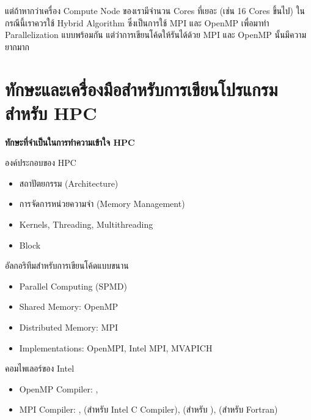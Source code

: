แต่ถ้าหากว่าเครื่อง Compute Node ของเรามีจำนวน Cores ที่เยอะ (เช่น 16 Cores ขึ้นไป) ในกรณีนี้เราควรใช้ Hybrid Algorithm ซึ่งเป็นการใช้
MPI และ OpenMP เพื่อมาทำ Parallelization แบบพร้อมกัน แต่ว่าการเขียนโค้ดให้รันได้ด้วย MPI และ OpenMP นั้นมีความยากมาก

\section{ทักษะและเครื่องมือสำหรับการเขียนโปรแกรมสำหรับ HPC}

\noindent \textbf{ทักษะที่จำเป็นในการทำความเข้าใจ HPC}

\noindent องค์ประกอบของ HPC
%
\begin{itemize}[topsep=0pt,noitemsep]
  \setlength\itemsep{0.5em}
  \item สถาปัตยกรรม (Architecture)

  \item การจัดการหน่วยความจำ (Memory Management)

  \item Kernels, Threading, Multithreading

  \item Block
\end{itemize}

\noindent อัลกอริทึมสำหรับการเขียนโค้ดแบบขนาน
%
\begin{itemize}[topsep=0pt,noitemsep]
  \setlength\itemsep{0.5em}
  \item Parallel Computing (SPMD)

  \item Shared Memory: OpenMP

  \item Distributed Memory: MPI

  \item Implementations: OpenMPI, Intel MPI, MVAPICH
\end{itemize}

\noindent คอมไพเลอร์ของ Intel
%
\begin{itemize}[topsep=0pt,noitemsep]
  \setlength\itemsep{0.5em}
  \item OpenMP Compiler: , 

  \item MPI Compiler: ,  (สำหรับ Intel C Compiler),
         (สำหรับ \cpp),  (สำหรับ Fortran)
\end{itemize}

